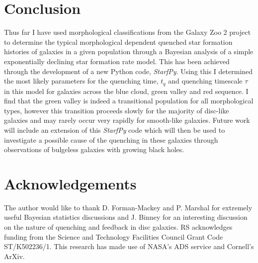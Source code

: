 \documentclass{mn2e}
\begin{document}
\section{Conclusion}\label{conc}
Thus far I have used morphological classifications from the Galaxy Zoo 2 project to determine the typical morphological dependent quenched star formation histories of galaxies in a given population through a Bayesian analysis of a simple exponentially declining star formation rate model. This has been achieved through the development of a new Python code, \emph{StarfPy}. Using this I determined the most likely parameters for the quenching time, $t_q$ and quenching timescale $\tau$ in this model for galaxies across the blue cloud, green valley and red sequence. I find that the green valley is indeed a transitional population for all morphological types, however this transition proceeds slowly for the majority of disc-like galaxies and may rarely occur very rapidly for smooth-like galaxies. Future work will include an extension of this \emph{StarfPy} code which will then be used to investigate a possible cause of the quenching in these galaxies through observations of bulgeless galaxies with growing black holes. 

\section*{Acknowledgements}
The author would like to thank D. Forman-Mackey and P. Marshal for extremely useful Bayesian statistics discussions and J. Binney for an interesting discussion on the nature of quenching and feedback in disc galaxies. 
RS acknowledges funding from the Science and Technology Facilities Council Grant Code ST/K502236/1.
This research has  made use of NASA's ADS service and Cornell's ArXiv. 
\end{document}

